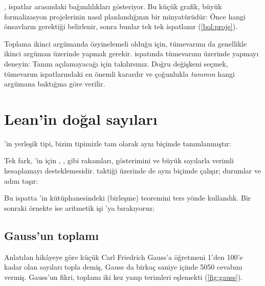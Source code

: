 , ispatlar arasındaki bağımlılıkları gösteriyor.
Bu küçük grafik, büyük formalizasyon projelerinin nasıl planlandığının
bir minyatürüdür: Önce hangi önsavların gerektiği belirlenir, sonra
bunlar tek tek ispatlanır (\cref{bol:proje}).

\begin{dikkat}
Toplama ikinci argümanda özyinelemeli olduğu için, tümevarımı da
genellikle ikinci argüman üzerinde yapmak gerekir. 
ispatında tümevarımı  üzerinde yapmayı deneyin: Tanım
açılamayacağı için takılırsınız. Doğru değişkeni seçmek, tümevarım
ispatlarındaki en önemli karardır ve çoğunlukla \emph{tanımın} hangi
argümana baktığına göre verilir.
\end{dikkat}

\section{Lean'in doğal sayıları}\label{sec:nat}

\Lean{}'in yerleşik  tipi, bizim  tipimizle tam olarak
aynı biçimde tanımlanmıştır:


\noindent Tek fark, \Lean{}'in  için , , 
gibi rakamları,  gösterimini ve büyük sayılarla verimli
hesaplamayı desteklemesidir.  taktiği  üzerinde
de aynı biçimde çalışır; durumlar  ve  adını taşır:


\noindent Bu ispatta \Lean{}'in kütüphanesindeki 
(birleşme) teoremini ters yönde kullandık. Bir sonraki örnekte ise
aritmetik işi 'ya bırakıyoruz:


\subsection{Gauss'un toplamı}

Anlatılan hikâyeye göre küçük Carl Friedrich Gauss'a öğretmeni
1'den 100'e kadar olan sayıları topla demiş, Gauss da birkaç saniye
içinde 5050 cevabını vermiş. Gauss'un fikri, toplamı iki kez yazıp
terimleri eşlemekti (\cref{fig:gauss}).

